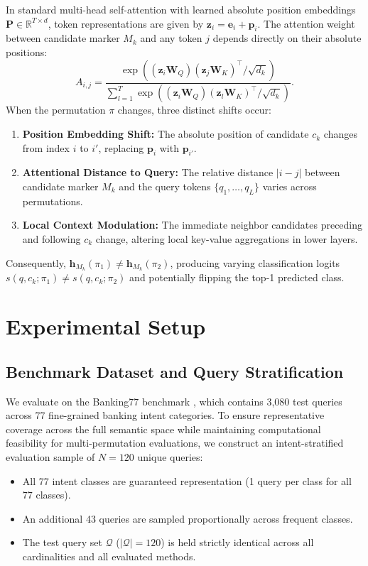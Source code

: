 \documentclass[10pt]{article}
\begin{document}
In standard multi-head self-attention with learned absolute position embeddings $\mathbf{P} \in \mathbb{R}^{T \times d}$, token representations are given by $\mathbf{z}_i = \mathbf{e}_i + \mathbf{p}_i$. The attention weight between candidate marker $M_k$ and any token $j$ depends directly on their absolute positions:
\begin{equation}
A_{i,j} = \frac{\exp\left( (\mathbf{z}_i \mathbf{W}_Q)(\mathbf{z}_j \mathbf{W}_K)^\top / \sqrt{d_k} \right)}{\sum_{l=1}^T \exp\left( (\mathbf{z}_i \mathbf{W}_Q)(\mathbf{z}_l \mathbf{W}_K)^\top / \sqrt{d_k} \right)}.
\end{equation}
When the permutation $\pi$ changes, three distinct shifts occur:
\begin{enumerate}
    \item \textbf{Position Embedding Shift:} The absolute position of candidate $c_k$ changes from index $i$ to $i'$, replacing $\mathbf{p}_i$ with $\mathbf{p}_{i'}$.
    \item \textbf{Attentional Distance to Query:} The relative distance $|i - j|$ between candidate marker $M_k$ and the query tokens $\{q_1, \dots, q_L\}$ varies across permutations.
    \item \textbf{Local Context Modulation:} The immediate neighbor candidates preceding and following $c_k$ change, altering local key-value aggregations in lower layers.
\end{enumerate}
Consequently, $\mathbf{h}_{M_k}(\pi_1) \neq \mathbf{h}_{M_k}(\pi_2)$, producing varying classification logits $s(q, c_k; \pi_1) \neq s(q, c_k; \pi_2)$ and potentially flipping the top-1 predicted class.

\section{Experimental Setup}

\subsection{Benchmark Dataset and Query Stratification}
We evaluate on the Banking77 benchmark \citep{casanueva2020efficient}, which contains 3,080 test queries across 77 fine-grained banking intent categories. To ensure representative coverage across the full semantic space while maintaining computational feasibility for multi-permutation evaluations, we construct an intent-stratified evaluation sample of $N=120$ unique queries:
\begin{itemize}
    \item All 77 intent classes are guaranteed representation (1 query per class for all 77 classes).
    \item An additional 43 queries are sampled proportionally across frequent classes.
    \item The test query set $\mathcal{Q}$ ($|\mathcal{Q}| = 120$) is held strictly identical across all cardinalities and all evaluated methods.
\end{itemize}
\end{document}
